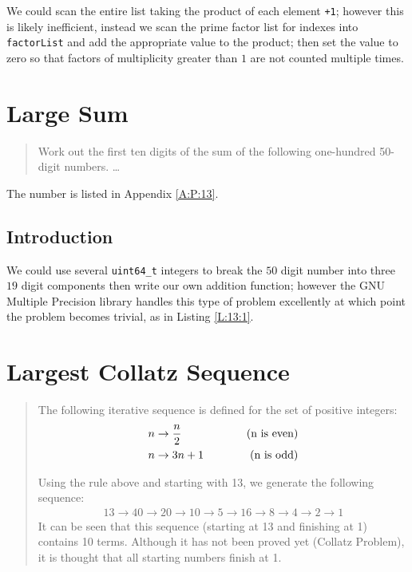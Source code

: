 \documentclass[oneside,12pt]{book}   	%
\newcounter{ex}
\newcounter{def}
\newcounter{pr}
\theoremstyle{definition}
\begin{document}
\begin{spacing}{1.618}
			We could scan the entire list taking the product of each element \texttt{+1}; however this is likely inefficient, instead we scan the prime factor list for indexes into \texttt{factorList} and add the appropriate value to the product; then set the value to zero so that factors of multiplicity greater than $1$ are not counted multiple times. 

			
	
	\chapter{Large Sum}
		\begin{quote}
			Work out the first ten digits of the sum of the following one-hundred 50-digit numbers. \dots
		\end{quote}
		The number is listed in Appendix \ref{A:P:13}. 
		
		\section{Introduction}
		
			We could use several \texttt{uint64\_t} integers to break the $50$ digit number into three $19$ digit components then write our own addition function; however the GNU Multiple Precision library handles this type of problem excellently at which point the problem becomes trivial, as in Listing \ref{L:13:1}. 
			
			
	
	\chapter{Largest Collatz Sequence}
		\begin{quote}
			The following iterative sequence is defined for the set of positive integers:
			\begin{alignat*}{4}
				n&\to  \frac{n}{2}&\hspace{1 cm}\textrm{(n is even)} \\
				n&\to  3n + 1&\hspace{1 cm} \textrm{(n is odd)}
			\end{alignat*}

			Using the rule above and starting with 13, we generate the following sequence:
			\begin{alignat*}{4}
				13 \to 40 \to 20 \to 10 \to 5 \to 16 \to 8 \to 4 \to 2 \to 1
			\end{alignat*}
			It can be seen that this sequence (starting at 13 and finishing at 1) contains 10 terms. Although it has not been proved yet (Collatz Problem), it is thought that all starting numbers finish at 1.


\end{quote}
\end{spacing}
\end{document}
